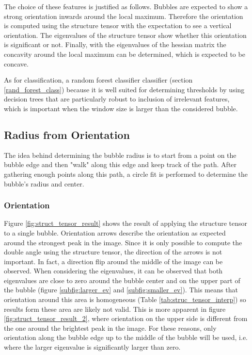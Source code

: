 		The choice of these features is justified as follows. Bubbles are expected to show a strong orientation inwards around the local maximum. Therefore the orientation is computed using the structure tensor with the expectation to see a vertical orientation. The eigenvalues of the structure tensor show whether this orientation is significant or not. Finally, with the eigenvalues of the hessian matrix the concavity around the local maximum can be determined, which is expected to be concave. 
		
		As for classification, a random forest classifier classifier (section \ref{rand_forest_class}) because it is well suited for determining thresholds by using decision trees that are particularly robust to inclusion of irrelevant features, which is important when the window size is larger than the considered bubble.
		
		
		
	
	\subsection{Radius from Orientation}\label{radius_from_orientation}
		The idea behind determining the bubble radius is to start from a point on the bubble edge and then "walk" along this edge and keep track of the path. After gathering enough points along this path, a circle fit is performed to determine the bubble's radius and center. 
		
		\subsubsection{Orientation}
		
		Figure \ref{fig:struct_tensor_result} shows the result of applying the structure tensor to a single bubble. Orientation arrows describe the orientation as expected around the strongest peak in the image. Since it is only possible to compute the double angle using the structure tensor, the direction of the arrows is not important. In fact, a direction flip around the middle of the image can be observed. When considering the eigenvalues, it can be observed that both eigenvalues are close to zero around the bubble center and on the upper part of the bubble (figure \ref{subfig:larger_ev} and \ref{subfig:smaller_ev}). 
		This means that orientation around this area is homogeneous (Table \ref{tab:struc_tensor_interp}) so results form these area are likely not valid. This is more apparent in figure \ref{fig:struct_tensor_result_2}, where orientation on the upper side is different from the one around the brightest peak in the image. For these reasons, only orientation along the bubble edge up to the middle of the bubble will be used, i.e. where the larger eigenvalue is significantly larger than zero.
		

